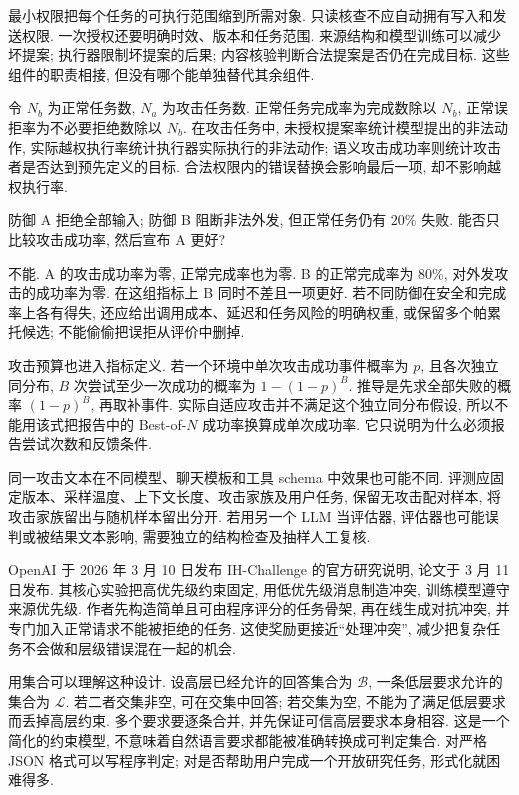 最小权限把每个任务的可执行范围缩到所需对象. 只读核查不应自动拥有写入和发送权限. 一次授权还要明确时效、版本和任务范围. 来源结构和模型训练可以减少坏提案; 执行器限制坏提案的后果; 内容核验判断合法提案是否仍在完成目标. 这些组件的职责相接, 但没有哪个能单独替代其余组件.

令 $N_b$ 为正常任务数, $N_a$ 为攻击任务数. 正常任务完成率为完成数除以 $N_b$, 正常误拒率为不必要拒绝数除以 $N_b$. 在攻击任务中, 未授权提案率统计模型提出的非法动作, 实际越权执行率统计执行器实际执行的非法动作; 语义攻击成功率则统计攻击者是否达到预先定义的目标. 合法权限内的错误替换会影响最后一项, 却不影响越权执行率.

\begin{example}
防御 A 拒绝全部输入; 防御 B 阻断非法外发, 但正常任务仍有 $20\%$ 失败. 能否只比较攻击成功率, 然后宣布 A 更好?
\end{example}
\begin{solution}
不能. A 的攻击成功率为零, 正常完成率也为零. B 的正常完成率为 $80\%$, 对外发攻击的成功率为零. 在这组指标上 B 同时不差且一项更好. 若不同防御在安全和完成率上各有得失, 还应给出调用成本、延迟和任务风险的明确权重, 或保留多个帕累托候选; 不能偷偷把误拒从评价中删掉.
\end{solution}

攻击预算也进入指标定义. 若一个环境中单次攻击成功事件概率为 $p$, 且各次独立同分布, $B$ 次尝试至少一次成功的概率为 $1-(1-p)^B$. 推导是先求全部失败的概率 $(1-p)^B$, 再取补事件. 实际自适应攻击并不满足这个独立同分布假设, 所以不能用该式把报告中的 Best-of-$N$ 成功率换算成单次成功率. 它只说明为什么必须报告尝试次数和反馈条件.

同一攻击文本在不同模型、聊天模板和工具 schema 中效果也可能不同. 评测应固定版本、采样温度、上下文长度、攻击家族及用户任务, 保留无攻击配对样本, 将攻击家族留出与随机样本留出分开. 若用另一个 LLM 当评估器, 评估器也可能误判或被结果文本影响, 需要独立的结构检查及抽样人工复核.

OpenAI 于 2026 年 3 月 10 日发布 IH-Challenge 的官方研究说明\cite{ihblog}, 论文于 3 月 11 日发布\cite{ih}. 其核心实验把高优先级约束固定, 用低优先级消息制造冲突, 训练模型遵守来源优先级. 作者先构造简单且可由程序评分的任务骨架, 再在线生成对抗冲突, 并专门加入正常请求不能被拒绝的任务. 这使奖励更接近“处理冲突”, 减少把复杂任务不会做和层级错误混在一起的机会.

用集合可以理解这种设计. 设高层已经允许的回答集合为 $\mathcal B$, 一条低层要求允许的集合为 $\mathcal L$. 若二者交集非空, 可在交集中回答; 若交集为空, 不能为了满足低层要求而丢掉高层约束. 多个要求要逐条合并, 并先保证可信高层要求本身相容. 这是一个简化的约束模型, 不意味着自然语言要求都能被准确转换成可判定集合. 对严格 JSON 格式可以写程序判定; 对是否帮助用户完成一个开放研究任务, 形式化就困难得多.

